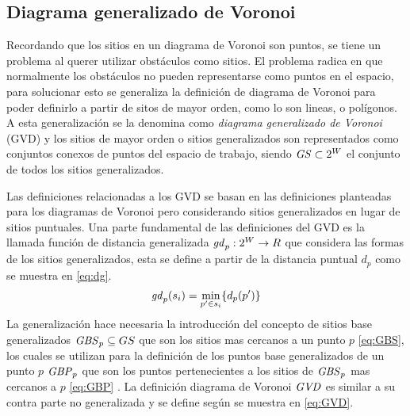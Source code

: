 
\subsection{Diagrama generalizado de Voronoi}
Recordando que los sitios en un diagrama de Voronoi son puntos, se tiene un problema al querer utilizar obstáculos como sitios. El problema radica en que normalmente los obstáculos no pueden representarse como puntos en el espacio, para solucionar esto se generaliza la definición de diagrama de Voronoi para poder definirlo a partir de sitos de mayor orden, como lo son lineas, o polígonos. A esta generalización se la denomina como \emph{diagrama generalizado de Voronoi} (GVD) y los sitios de mayor orden o sitios generalizados son representados como conjuntos conexos de puntos del espacio de trabajo, siendo $\mathit{GS}\subset 2^{W}$ el conjunto de todos los sitios generalizados.


Las definiciones relacionadas a los GVD se basan en las definiciones planteadas para los diagramas de Voronoi pero considerando sitios generalizados en lugar de sitios puntuales. Una parte fundamental de las definiciones del GVD es la llamada función de distancia generalizada $\mathit{gd}_p : 2^{W} \rightarrow R$ que considera las formas de los sitios generalizados, esta se define a partir de la distancia puntual $d_p$ como se muestra en \eqref{eq:dg}.
\begin{equation}
  \mathit{gd}_p(s_i) = \min_{p'\in s_i}\{d_p(p')\} \label{eq:dg}
\end{equation}
La generalización hace necesaria la introducción del concepto de sitios base generalizados $\mathit{GBS}_p\subseteq GS$ que son los sitios mas cercanos a un punto $p$ \eqref{eq:GBS}, los cuales se utilizan para la definición de los puntos base generalizados de un punto $p$ $\mathit{GBP}_p$ que son los puntos pertenecientes a los sitios de $\mathit{GBS}_p$ mas cercanos a $p$ \eqref{eq:GBP} . 
La definición diagrama de Voronoi $\mathit{GVD}$ es similar a su contra parte no generalizada y se define según se muestra en \eqref{eq:GVD}. 


